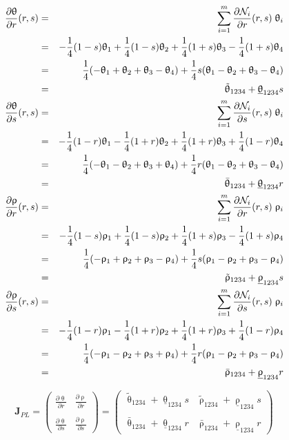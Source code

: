 \begin{eqnarray}
\frac{\partial\uptheta}{\partial r}(r,s) 
&=& \sum_{i=1}^m \frac{\partial{\mathcal{N}}_i}{\partial r}(r,s)\; \uptheta_i \nonumber\\
&=& -\frac14 (1-s) \uptheta_1 + \frac14 (1-s)\uptheta_2 + \frac14(1+s) \uptheta_3 - \frac14(1+s) \uptheta_4 \nonumber\\
&=& \frac14 (-\uptheta_1 + \uptheta_2 + \uptheta_3 - \uptheta_4) 
+\frac14 s(\uptheta_1-\uptheta_2+\uptheta_3-\uptheta_4) \nonumber\\
&=&\tilde{\uptheta}_{1234} + \underline{\uptheta}_{1234}s
\nonumber\\
\frac{\partial\uptheta}{\partial s}(r,s) 
&=& \sum_{i=1}^m \frac{\partial{\mathcal{N}}_i}{\partial s}(r,s)\; \uptheta_i  \nonumber\\
&=&-\frac14 (1-r)\uptheta_1 - \frac14(1+r) \uptheta_2 + \frac14 (1+r)\uptheta_3 + \frac14(1-r) \uptheta_4 \nonumber\\
&=& \frac14 (-\uptheta_1 - \uptheta_2 + \uptheta_3 + \uptheta_4)  
+\frac14 r (\uptheta_1 -\uptheta_2  +\uptheta_3 -\uptheta_4 ) \nonumber\\
&=& \bar{\uptheta}_{1234} + \underline{\uptheta}_{1234}r
\nonumber\\
\frac{\partial\uprho}{\partial r}(r,s)   
&=& \sum_{i=1}^m \frac{\partial{\mathcal{N}}_i}{\partial r}(r,s)\; \uprho_i   \nonumber\\
&=&-\frac14 (1-s)\uprho_1 + \frac14 (1-s)\uprho_2 + \frac14 (1+s)\uprho_3 - \frac14 (1+s)\uprho_4 \nonumber\\
&=& \frac14 (-\uprho_1 + \uprho_2 + \uprho_3 - \uprho_4) 
+\frac14 s (\uprho_1 - \uprho_2 + \uprho_3 - \uprho_4) \nonumber\\
&=& \tilde{\uprho}_{1234} + \underline{\uprho}_{1234} s
\nonumber\\
\frac{\partial\uprho}{\partial s}(r,s)   
&=& \sum_{i=1}^m \frac{\partial{\mathcal{N}}_i}{\partial s}(r,s)\; \uprho_i    \nonumber\\
&=& -\frac14 (1-r)\uprho_1 - \frac14(1+r) \uprho_2 + \frac14(1+r) \uprho_3 + \frac14 (1-r)\uprho_4  \nonumber\\
&=& \frac14 (-\uprho_1 - \uprho_2 + \uprho_3 + \uprho_4) 
+ \frac14 r (\uprho_1 - \uprho_2 + \uprho_3 - \uprho_4) \nonumber\\
&=& \bar{\uprho}_{1234} + \underline{\uprho}_{1234} r
\end{eqnarray}

\[
{\bm J}_{PL}=
\left(
\begin{array}{cc}
\frac{\partial \uptheta}{\partial r}  & 
\frac{\partial \uprho}{\partial r}  \\ \\
\frac{\partial \uptheta}{\partial s}  & 
\frac{\partial \uprho}{\partial s}
\end{array}
\right)
=
\left(
\begin{array}{cc}
\tilde{\uptheta}_{1234} + \underline{\uptheta}_{1234}s &  \tilde{\uprho}_{1234} + \underline{\uprho}_{1234} s \\\\
\bar{\uptheta}_{1234} + \underline{\uptheta}_{1234}r & \bar{\uprho}_{1234} + \underline{\uprho}_{1234} r
\end{array}
\right)
\]


